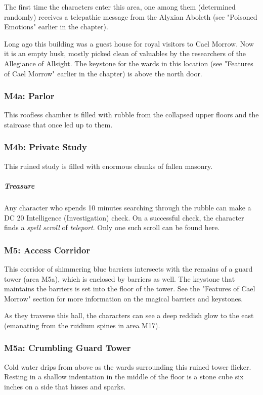 \documentclass[10pt,a4paper,twoside,fancy,bg=print,twocolumn,openany,nodeprecatedcode]{dndbook}
\begin{document}
The first time the characters enter this area, one among them (determined randomly) receives a telepathic message from the Alyxian Aboleth (see "Poisoned Emotions" earlier in the chapter).

Long ago this building was a guest house for royal visitors to Cael Morrow. Now it is an empty husk, mostly picked clean of valuables by the researchers of the Allegiance of Allsight. The keystone for the wards in this location (see "Features of Cael Morrow" earlier in the chapter) is above the north door.

\subsubsection{M4a: Parlor}
This roofless chamber is filled with rubble from the collapsed upper floors and the staircase that once led up to them.

\subsubsection{M4b: Private Study}
This ruined study is filled with enormous chunks of fallen masonry.

\subparagraph{Treasure}
Any character who spends 10 minutes searching through the rubble can make a DC 20 Intelligence (Investigation) check. On a successful check, the character finds a \textit{spell scroll} of \textit{teleport}. Only one such scroll can be found here.

\subsubsection{M5: Access Corridor}
This corridor of shimmering blue barriers intersects with the remains of a guard tower (area M5a), which is enclosed by barriers as well. The keystone that maintains the barriers is set into the floor of the tower. See the "Features of Cael Morrow" section for more information on the magical barriers and keystones.

As they traverse this hall, the characters can see a deep reddish glow to the east (emanating from the ruidium spines in area M17).

\subsubsection{M5a: Crumbling Guard Tower}
\begin{DndReadAloud}{}
Cold water drips from above as the wards surrounding this ruined tower flicker. Resting in a shallow indentation in the middle of the floor is a stone cube six inches on a side that hisses and sparks.

\end{DndReadAloud}
\end{document}
